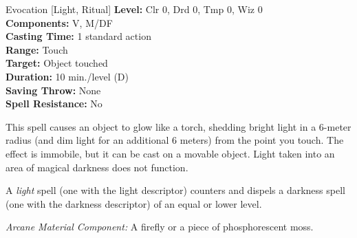 {Evocation [Light, Ritual]}
{
	\textbf{Level:}
	Clr 0, Drd 0, Tmp 0, Wiz 0\\
	\textbf{Components:}
	V, M/DF\\
	\textbf{Casting Time:}
	1 standard action\\
	\textbf{Range:}
	Touch\\
	\textbf{Target:}
	Object touched\\
	\textbf{Duration:}
	10 min./level (D)\\
	\textbf{Saving Throw:}
	None\\
	\textbf{Spell Resistance:}
	No\\
}
{
	This spell causes an object to glow like a torch, shedding bright light in a 6-meter radius (and dim light for an additional 6 meters) from the point you touch. The effect is immobile, but it can be cast on a movable object. Light taken into an area of magical darkness does not function.

	A \emph{light} spell (one with the light descriptor) counters and dispels a darkness spell (one with the darkness descriptor) of an equal or lower level.

	\textit{Arcane Material Component:}
	A firefly or a piece of phosphorescent moss.

}
